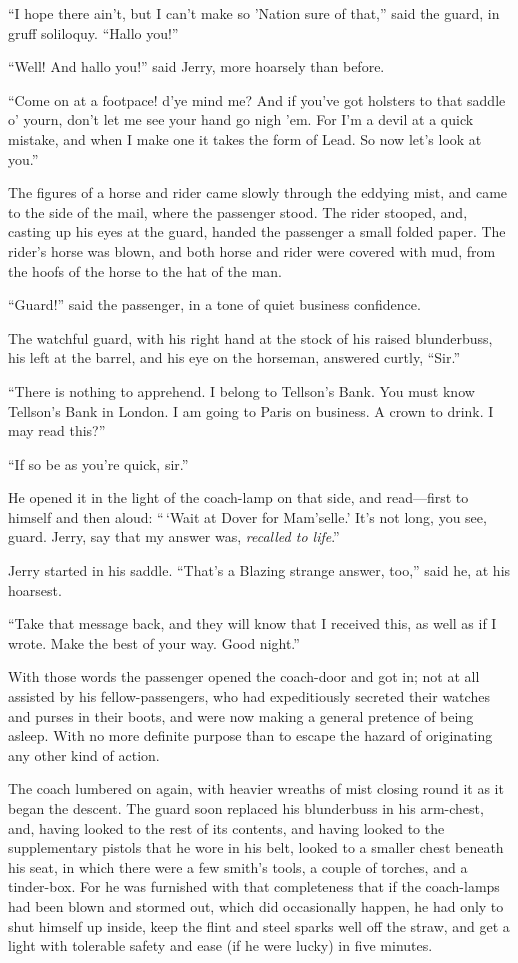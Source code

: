 ``I hope there ain't, but I can't make so 'Nation sure of that,''
said the guard, in gruff soliloquy.  ``Hallo you!''

``Well!  And hallo you!'' said Jerry, more hoarsely than before.

``Come on at a footpace! d'ye mind me?  And if you've got holsters
to that saddle o' yourn, don't let me see your hand go nigh 'em.
For I'm a devil at a quick mistake, and when I make one it takes
the form of Lead.  So now let's look at you.''

The figures of a horse and rider came slowly through the eddying
mist, and came to the side of the mail, where the passenger stood.
The rider stooped, and, casting up his eyes at the guard, handed
the passenger a small folded paper.  The rider's horse was blown,
and both horse and rider were covered with mud, from the hoofs of
the horse to the hat of the man.

``Guard!'' said the passenger, in a tone of quiet business confidence.

The watchful guard, with his right hand at the stock of his raised
blunderbuss, his left at the barrel, and his eye on the horseman,
answered curtly, ``Sir.''

``There is nothing to apprehend.  I belong to Tellson's Bank.
You must know Tellson's Bank in London.  I am going to Paris
on business.  A crown to drink.  I may read this?''

``If so be as you're quick, sir.''

He opened it in the light of the coach-lamp on that side,
and read---first to himself and then aloud:  ``\,`Wait at Dover for
Mam'selle.' It's not long, you see, guard.  Jerry, say that my
answer was, \emph{recalled to life}.''

Jerry started in his saddle.  ``That's a Blazing strange answer, too,''
said he, at his hoarsest.

``Take that message back, and they will know that I received this,
as well as if I wrote.  Make the best of your way.  Good night.''

With those words the passenger opened the coach-door and got in;
not at all assisted by his fellow-passengers, who had
expeditiously secreted their watches and purses in their boots,
and were now making a general pretence of being asleep.  With no
more definite purpose than to escape the hazard of originating
any other kind of action.

The coach lumbered on again, with heavier wreaths of mist closing
round it as it began the descent. The guard soon replaced his
blunderbuss in his arm-chest, and, having looked to the rest of its
contents, and having looked to the supplementary pistols that he wore
in his belt, looked to a smaller chest beneath his seat, in which
there were a few smith's tools, a couple of torches, and a tinder-box.
For he was furnished with that completeness that if the coach-lamps
had been blown and stormed out, which did occasionally happen, he had
only to shut himself up inside, keep the flint and steel sparks well
off the straw, and get a light with tolerable safety and ease (if he
were lucky) in five minutes.

